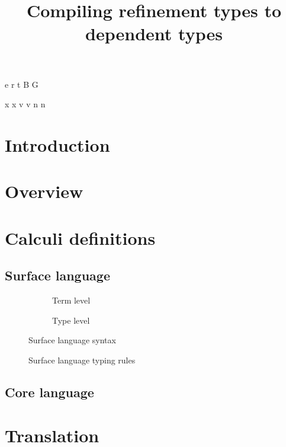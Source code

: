 \documentclass[a4paper]{article}
\begin{document}
\newnonterm e \varepsilon
\newnonterm r \rho
\newnonterm t \tau
\newnonterm B {}
\newnonterm G \Gamma
{}

\newgterm x x
\newgterm v v
\newgterm n n


\title{Compiling refinement types to dependent types}

\maketitle

\section{Introduction}

\section{Overview}

\section{Calculi definitions}

\subsection{Surface language}

\begin{figure}[ht]
  \footnotesize
  \begin{subfigure}{.6\textwidth}
	\caption{Term level}
  \end{subfigure}
  \begin{subfigure}{.5\textwidth}
	\caption{Type level}
  \end{subfigure}
  \caption{Surface language syntax}
  \label{fig:surface_syntax}
\end{figure}

\begin{figure}[ht]
  \footnotesize
  \caption{Surface language typing rules}
  \label{fig:surface_typing}
\end{figure}

\subsection{Core language}

\section{Translation}
\end{document}
